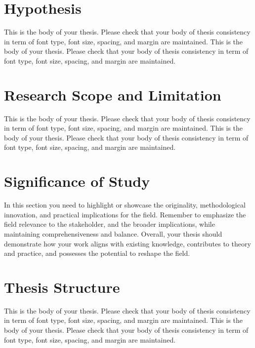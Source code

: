     \section{Hypothesis}
  	\label{sec:hypothesis}
		This is the body of your thesis. Please check that your body of thesis consistency in term of font type, font size, spacing, and margin are maintained. This is the body of your thesis. Please check that your body of thesis consistency in term of font type, font size, spacing, and margin are maintained.
	
	 \section{Research Scope and Limitation}
	  \label{sec:research-scope-of-works}
		This is the body of your thesis. Please check that your body of thesis consistency in term of font type, font size, spacing, and margin are maintained. This is the body of your thesis. Please check that your body of thesis consistency in term of font type, font size, spacing, and margin are maintained.

	\section{Significance of Study}
	\label{sec:significance-of-study}
	In this section you need to highlight or showcase the originality, methodological innovation, and practical implications for the field. Remember to emphasize the field relevance to the stakeholder, and the broader implications, while maintaining comprehensiveness and balance. Overall, your thesis should demonstrate how your work aligns with existing knowledge, contributes to theory and practice, and possesses the potential to reshape the field.

	\section{Thesis Structure}
	This is the body of your thesis. Please check that your body of thesis consistency in term of font type, font size, spacing, and margin are maintained. This is the body of your thesis. Please check that your body of thesis consistency in term of font type, font size, spacing, and margin are maintained.
    